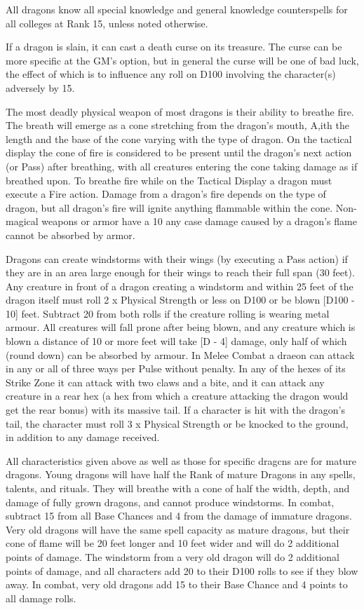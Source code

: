 \begin{multicols}{2}
All dragons know all special knowledge and general knowledge
counterspells for all colleges at Rank 15, unless noted otherwise.

If a dragon is slain, it can cast a death curse on its treasure.  The
curse can be more specific at the GM's option, but in general the
curse will be one of bad luck, the effect of which is to influence any
roll on D100 involving the character(s) adversely by 15.

The most deadly physical weapon of most dragons is their ability to
breathe fire. The breath will emerge as a cone stretching from the
dragon's mouth, A,ith the length and the base of the cone varying with
the type of dragon.  On the tactical display the cone of fire is
considered to be present until the dragon's next action (or Pass)
after breathing, with all creatures entering the cone taking damage as
if breathed upon.  To breathe fire while on the Tactical Display a
dragon must execute a Fire action.  Damage from a dragon's fire
depends on the type of dragon, but all dragon's fire will ignite
anything flammable within the cone.  Non-magical weapons or armor have
a 10%
any case damage caused by a dragon's flame cannot be absorbed by
armor.

Dragons can create windstorms with their wings (by executing a Pass
action) if they are in an area large enough for their wings to reach
their full span (30 feet).  Any creature in front of a dragon creating
a windstorm and within 25 feet of the dragon itself must roll 2 x
Physical Strength or less on D100 or be blown [D100 - 10] feet.
Subtract 20 from both rolls if the creature rolling is wearing metal
armour.  All creatures will fall prone after being blown, and any
creature which is blown a distance of 10 or more feet will take [D -
4] damage, only half of which (round down) can be absorbed by armour.
In Melee Combat a draeon can attack in any or all of three ways per
Pulse without penalty.  In any of the hexes of its Strike Zone it can
attack with two claws and a bite, and it can attack any creature in a
rear hex (a hex from which a creature attacking the dragon would get
the rear bonus) with its massive tail.  If a character is hit with the
dragon's tail, the character must roll 3 x Physical Strength or be
knocked to the ground, in addition to any damage received.

All characteristics given above as well as those for specific dragcns
are for mature dragons.  Young dragons will have half the Rank of
mature Dragons in any spells, talents, and rituals.  They will breathe
with a cone of half the width, depth, and damage of fully grown
dragons, and cannot produce windstorms.  In combat, subtract 15 from
all Base Chances and 4 from the damage of immature dragons.  Very old
dragons will have the same spell capacity as mature dragons, but their
cone of flame will be 20 feet longer and 10 feet wider and will do 2
additional points of damage.  The windstorm from a very old dragon
will do 2 additional points of damage, and all characters add 20 to
their D100 rolls to see if they blow away.  In combat, very old
dragons add 15 to their Base Chance and 4 points to all damage rolls.


\end{multicols}
